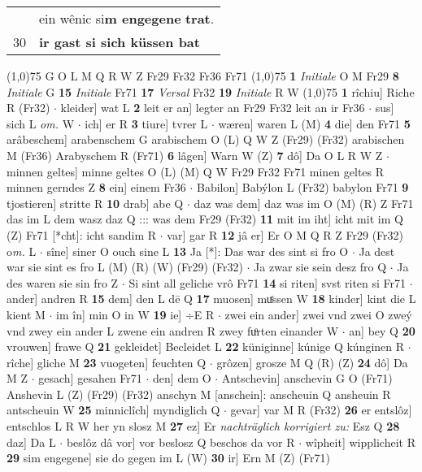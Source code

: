 \documentclass[8pt,a4paper,notitlepage]{article}
\begin{document}
\begin{table}[ht]
\begin{minipage}[t]{0.5\linewidth}
\begin{tabular}{rl}
 & ein wênic si\textbf{m engegene} \textbf{trat}.\\ 
30 & \textbf{ir gast si sich küssen bat}\\ 
\end{tabular}
\scriptsize
\line(1,0){75} \newline
G O L M Q R W Z Fr29 Fr32 Fr36 Fr71 \newline
\line(1,0){75} \newline
\textbf{1} \textit{Initiale} O M Fr29  \textbf{8} \textit{Initiale} G  \textbf{15} \textit{Initiale} Fr71  \textbf{17} \textit{Versal} Fr32  \textbf{19} \textit{Initiale} R W  \newline
\line(1,0){75} \newline
\textbf{1} rîchiu] Riche R (Fr32)  $\cdot$ kleider] wat L \textbf{2} leit er an] legter an Fr29 Fr32 leit an ir Fr36  $\cdot$ sus] sich L \textit{om.} W  $\cdot$ ich] er R \textbf{3} tiure] tvrer L  $\cdot$ wæren] waren L (M) \textbf{4} die] den Fr71 \textbf{5} arâbeschem] arabenschem G arabischem O (L) Q W Z (Fr29) (Fr32) arabischen M (Fr36) Arabyschem R (Fr71) \textbf{6} lâgen] Warn W (Z) \textbf{7} dô] Da O L R W Z  $\cdot$ minnen geltes] minne geltes O (L) (M) Q W Fr29 Fr32 Fr71 minen geltes R minnen gerndes Z \textbf{8} ein] einem Fr36  $\cdot$ Babilon] Babýlon L (Fr32) babylon Fr71 \textbf{9} tjostieren] stritte R \textbf{10} drab] abe Q  $\cdot$ daz was dem] daz was im O (M) (R) Z Fr71 das im L dem wasz daz Q ::: was dem Fr29 (Fr32) \textbf{11} mit im iht] icht mit im Q (Z) Fr71 [*cht]: icht sandim R  $\cdot$ var] gar R \textbf{12} jâ er] Er O M Q R Z Fr29 (Fr32) o\textit{m. } L  $\cdot$ sîne] siner O ouch sine L \textbf{13} Ja [*]: Das war des sint si fro O  $\cdot$ Ja dest war sie sint es fro L (M) (R) (W) (Fr29) (Fr32)  $\cdot$ Ja zwar sie sein desz fro Q  $\cdot$ Ja des waren sie sin fro Z  $\cdot$ Si sint all geliche vrô Fr71 \textbf{14} si riten] svst riten si Fr71  $\cdot$ ander] andren R \textbf{15} dem] den L dē Q \textbf{17} muosen] muͤssen W \textbf{18} kinder] kint die L kient M  $\cdot$ im în] min O in W \textbf{19} ie] ÷E R  $\cdot$ zwei ein ander] zwei vnd zwei O zweý vnd zwey ein ander L zwene ein andren R zwey fuͦrten einander W  $\cdot$ an] bey Q \textbf{20} vrouwen] frawe Q \textbf{21} gekleidet] Becleidet L \textbf{22} küniginne] kúnige Q kúnginen R  $\cdot$ rîche] gliche M \textbf{23} vuogeten] feuchten Q  $\cdot$ grôzen] grosze M Q (R) (Z) \textbf{24} dô] Da M Z  $\cdot$ gesach] gesahen Fr71  $\cdot$ den] dem O  $\cdot$ Antschevin] anschevin G O (Fr71) Anshevin L (Z) (Fr29) (Fr32) anschyn M [anschein]: anscheuin Q ansheuin R antscheuin W \textbf{25} minniclîch] myndiglich Q  $\cdot$ gevar] var M R (Fr32) \textbf{26} er entslôz] entschlos L R W her yn slosz M \textbf{27} ez] Er \textit{nachträglich korrigiert zu:} Esz Q \textbf{28} daz] Da L  $\cdot$ beslôz dâ vor] vor beslosz Q beschos da vor R  $\cdot$ wîpheit] wipplicheit R \textbf{29} sim engegene] sie do gegen im L (W) \textbf{30} ir] Ern M (Z) (Fr71) \newline

\end{minipage}
\end{table}
\end{document}
